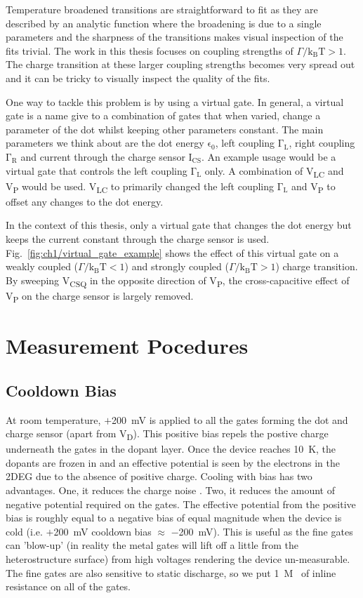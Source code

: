 Temperature broadened transitions are straightforward to fit as they are described by an analytic function where the broadening is due to a single parameters and the sharpness of the transitions makes visual inspection of the fits trivial. The work in this thesis focuses on coupling strengths of $\Gamma/\mathrm{k_BT}>1$. The charge transition at these larger coupling strengths becomes very spread out and it can be tricky to visually inspect the quality of the fits. 

One way to tackle this problem is by using a virtual gate. In general, a virtual gate is a name give to a combination of gates that when varied, change a parameter of the dot whilst keeping other parameters constant. The main parameters we think about are the dot energy $\mathrm{\epsilon_0}$, left coupling $\mathrm{\Gamma_L}$, right coupling $\mathrm{\Gamma_R}$ and current through the charge sensor $\mathrm{I_{CS}}$. An example usage would be a virtual gate that controls the left coupling $\mathrm{\Gamma_L}$ only. A combination of V\textsubscript{LC} and V\textsubscript{P} would be used. V\textsubscript{LC} to primarily changed the left coupling $\mathrm{\Gamma_L}$ and V\textsubscript{P} to offset any changes to the dot energy. 

In the context of this thesis, only a virtual gate that changes the dot energy but keeps the current constant through the charge sensor is used. Fig.~\ref{fig:ch1/virtual_gate_example} shows the effect of this virtual gate on a weakly coupled ($\Gamma/\mathrm{k_BT}<1$) and strongly coupled ($\Gamma/\mathrm{k_BT}>1$) charge transition. By sweeping V\textsubscript{CSQ} in the opposite direction of V\textsubscript{P}, the cross-capacitive effect of V\textsubscript{P} on the charge sensor is largely removed. 


\afterpage{\clearpage}
\section{Measurement Pocedures}

\subsection{Cooldown Bias}
At room temperature, $+$\qty{200}{mV} is applied to all the gates forming the dot and charge sensor (apart from V\textsubscript{D}). This positive bias repels the postive charge underneath the gates in the dopant layer. Once the device reaches \qty{10}{K}, the dopants are frozen in and an effective potential is seen by the electrons in the 2DEG due to the absence of positive charge. Cooling with bias has two advantages. One, it reduces the charge noise \cite{bias_cooling}. Two, it reduces the amount of negative potential required on the gates. The effective potential from the positive bias is roughly equal to a negative bias of equal magnitude when the device is cold (i.e. $+$\qty{200}{mV} cooldown bias $\approx$ $-$\qty{200}{mV}). This is useful as the fine gates can 'blow-up' (in reality the metal gates will lift off a little from the heterostructure surface) from high voltages rendering the device un-measurable. The fine gates are also sensitive to static discharge, so we put \qty{1}{M\Omega} of inline resistance on all of the gates.   

